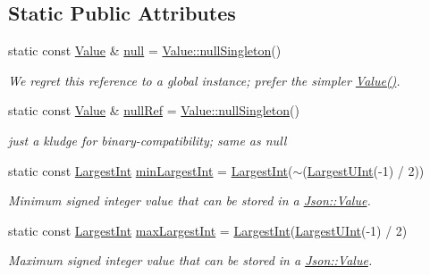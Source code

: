\subsection*{Static Public Attributes}
\begin{DoxyCompactItemize}
\item 
static const \hyperlink{class_json_1_1_value}{Value} \& \hyperlink{class_json_1_1_value_a21ddb05b92c60c7548e928bf371e7d45}{null} = \hyperlink{class_json_1_1_value_af2f124567acc35d021a424e53ebdfcab}{Value\+::null\+Singleton}()
\begin{DoxyCompactList}\small\item\em We regret this reference to a global instance; prefer the simpler \hyperlink{class_json_1_1_value_ada6ba1369448fb0240bccc36efaa46f7}{Value()}. \end{DoxyCompactList}\item 
static const \hyperlink{class_json_1_1_value}{Value} \& \hyperlink{class_json_1_1_value_aaee27e622f87266f861216d644603730}{null\+Ref} = \hyperlink{class_json_1_1_value_af2f124567acc35d021a424e53ebdfcab}{Value\+::null\+Singleton}()
\begin{DoxyCompactList}\small\item\em just a kludge for binary-\/compatibility; same as null \end{DoxyCompactList}\item 
static const \hyperlink{class_json_1_1_value_a1cbb82642ed05109b9833e49f042ece7}{Largest\+Int} \hyperlink{class_json_1_1_value_af91df130daa50dd43d2cd89e6ee67706}{min\+Largest\+Int} = \hyperlink{class_json_1_1_value_a1cbb82642ed05109b9833e49f042ece7}{Largest\+Int}($\sim$(\hyperlink{class_json_1_1_value_a6682a3684d635e03fc06ba229fa24eec}{Largest\+U\+Int}(-\/1) / 2))
\begin{DoxyCompactList}\small\item\em Minimum signed integer value that can be stored in a \hyperlink{class_json_1_1_value}{Json\+::\+Value}. \end{DoxyCompactList}\item 
static const \hyperlink{class_json_1_1_value_a1cbb82642ed05109b9833e49f042ece7}{Largest\+Int} \hyperlink{class_json_1_1_value_a8b4977696f13296fa8755c7953fafb2f}{max\+Largest\+Int} = \hyperlink{class_json_1_1_value_a1cbb82642ed05109b9833e49f042ece7}{Largest\+Int}(\hyperlink{class_json_1_1_value_a6682a3684d635e03fc06ba229fa24eec}{Largest\+U\+Int}(-\/1) / 2)
\begin{DoxyCompactList}\small\item\em Maximum signed integer value that can be stored in a \hyperlink{class_json_1_1_value}{Json\+::\+Value}. \end{DoxyCompactList}\item 

\end{DoxyCompactItemize}
